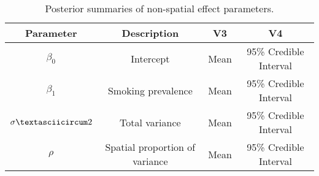 \begin{table}[ht]
\centering
\begin{tabular}{cccc}
  \hline
Parameter & Description & V3 & V4 \\ 
  \hline
$\beta_0$ & Intercept & Mean & 95\% Credible Interval \\ 
  $\beta_1$ & Smoking prevalence & Mean & 95\% Credible Interval \\ 
  $\sigmaˆ2$ & Total variance & Mean & 95\% Credible Interval \\ 
  $\rho$ & Spatial proportion of variance & Mean & 95\% Credible Interval \\ 
   \hline
\end{tabular}
\caption{Posterior summaries of non-spatial effect parameters.} 
\label{tab:RDA_post_summaries}
\end{table}
